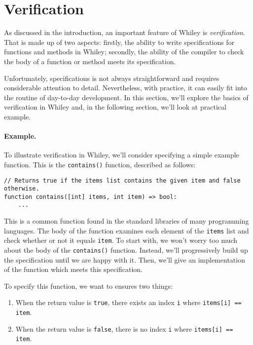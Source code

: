 \section{Verification}

As discussed in the introduction, an important feature of Whiley is
{\em verification}.  That is made up of two aspects: firstly, the
ability to write specifications for functions and methods in Whiley;
secondly, the ability of the compiler to check the body of a function
or method meets its specification.

Unfortunately, specifications is not always straightforward and
requires considerable attention to detail.  Nevertheless, with
practice, it can easily fit into the routine of day-to-day
development.  In this section, we'll explore the basics of
verification in Whiley and, in the following section, we'll look at
practical example.

\paragraph{Example.}  To illustrate verification in Whiley, we'll
consider specifying a simple example function.  This is the
\lstinline{contains()} function, described as follows:

\begin{lstlisting}
// Returns true if the items list contains the given item and false otherwise.
function contains([int] items, int item) => bool:
    ...
\end{lstlisting}

This is a common function found in the standard libraries of many
programming languages.  The body of the function examines each element
of the \lstinline{items} list and check whether or not it equals
\lstinline{item}.  To start with, we won't worry too much about the
body of the \lstinline{contains()} function.  Instead, we'll
progressively build up the specification until we are happy with it.
Then, we'll give an implementation of the function which meets this
specification.

To specify this function, we want to ensures two things:

\begin{enumerate}
\item When the return value is \lstinline{true}, there exists an index
  \lstinline{i} where \lstinline{items[i] == item}.
\item When the return value is \lstinline{false}, there is no index
  \lstinline{i} where \lstinline{items[i] == item}.
\end{enumerate}

